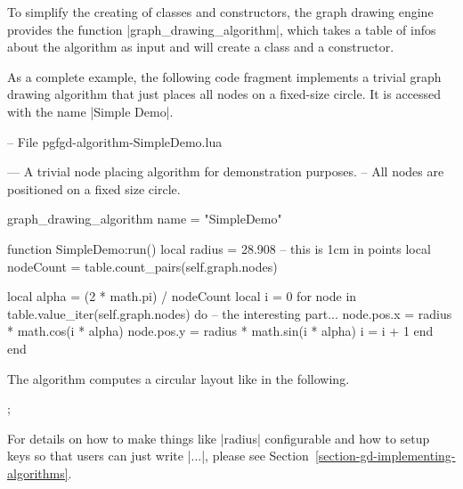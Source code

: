 To simplify the creating of classes and constructors, the graph
drawing engine provides the function |graph_drawing_algorithm|, which
takes a table of infos about the algorithm as input and will create a
class and a constructor.

As a complete example, the following code fragment implements a
trivial graph drawing algorithm that just places all nodes on a
fixed-size circle.  It is accessed with the name 
|Simple Demo|.


\begin{codeexample}
-- File pgfgd-algorithm-SimpleDemo.lua

--- A trivial node placing algorithm for demonstration purposes.
-- All nodes are positioned on a fixed size circle.

graph_drawing_algorithm { name = "SimpleDemo" }

function SimpleDemo:run()
   local radius = 28.908  -- this is 1cm in points
   local nodeCount = table.count_pairs(self.graph.nodes)

   local alpha = (2 * math.pi) / nodeCount
   local i = 0
   for node in table.value_iter(self.graph.nodes) do
      -- the interesting part...
      node.pos.x = radius * math.cos(i * alpha)
      node.pos.y = radius * math.sin(i * alpha)
      i = i + 1
   end
end
\end{codeexample}

The algorithm computes a circular layout like in the following.

\begin{codeexample}[]
\tikz [graph drawing scope, /graph drawing/algorithm=Simple Demo]
  ;
\end{codeexample}

For details on how to make things like |radius| configurable and how
to setup keys so that users can just write
| ...|, please see Section~\ref{section-gd-implementing-algorithms}.


\endinput

